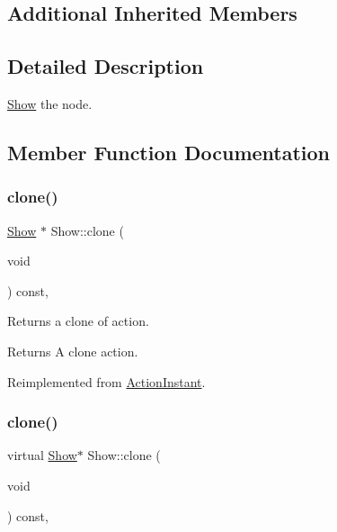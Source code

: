 \subsection*{Additional Inherited Members}


\subsection{Detailed Description}
\hyperlink{classShow}{Show} the node. 

\subsection{Member Function Documentation}
\mbox{\label{classShow_a0832b6fc1f6fcabc9284f0707d95881d}} 
\subsubsection{\texorpdfstring{clone()}{clone()}\hspace{0.1cm}{\footnotesize\ttfamily [1/2]}}
{\footnotesize\ttfamily \hyperlink{classShow}{Show} $\ast$ Show\+::clone (\begin{DoxyParamCaption}\item[{void}]{ }\end{DoxyParamCaption}) const\hspace{0.3cm}{\ttfamily [override]}, {\ttfamily [virtual]}}

Returns a clone of action.

\begin{DoxyReturn}{Returns}
A clone action. 
\end{DoxyReturn}


Reimplemented from \hyperlink{classActionInstant_adb76fc6f006098109e8256210cbd8cc0}{Action\+Instant}.

\mbox{\label{classShow_a32b347c4d1fbd6336975903a3a2e8991}} 
\subsubsection{\texorpdfstring{clone()}{clone()}\hspace{0.1cm}{\footnotesize\ttfamily [2/2]}}
{\footnotesize\ttfamily virtual \hyperlink{classShow}{Show}$\ast$ Show\+::clone (\begin{DoxyParamCaption}\item[{void}]{ }\end{DoxyParamCaption}) const\hspace{0.3cm}{\ttfamily [override]}, {\ttfamily [virtual]}}

